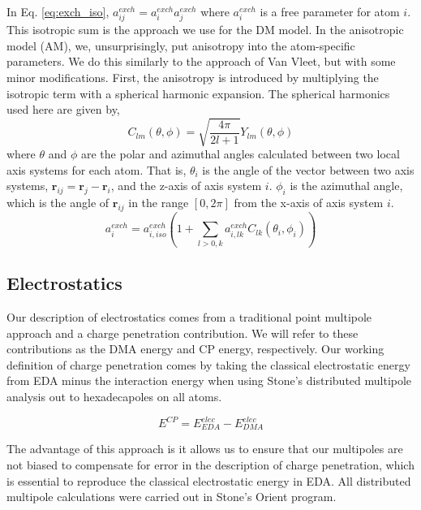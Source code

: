 \documentclass[journal=jacsat,manuscript=article]{achemso}
\begin{document}
In Eq. \ref{eq:exch_iso}, $a_{ij}^{exch}=a_{i}^{exch}a_{j}^{exch}$ where
$a_{i}^{exch}$ is a free parameter for atom $i$. This isotropic sum is the
approach we use for the DM model. In the anisotropic model (AM), we,
unsurprisingly, put anisotropy into the atom-specific parameters.
We do this similarly to the approach of Van Vleet, but with some minor
modifications\cite{van2018new}. First, the anisotropy is introduced by multiplying
the isotropic term with a spherical harmonic expansion. The spherical harmonics
used here are given by,
\begin{equation}
  C_{lm}(\theta,\phi)=\sqrt{\frac{4\pi}{2l+1}}Y_{lm}(\theta,\phi)
\end{equation}
where $\theta$ and $\phi$ are the polar and azimuthal angles
calculated between two local axis systems for each atom.\cite{bernardo1994anisotropic}
That is, $\theta_i$ is the angle of the vector between two axis systems,
$\bm{r}_{ij}=\bm{r}_j-\bm{r}_i$, and the z-axis of axis system $i$.
$\phi_i$ is the azimuthal angle, which is the angle of $\bm{r}_{ij}$ in the range $[0,2\pi]$ from the
x-axis of axis system $i$.
\begin{equation}
  a_i^{exch} = a_{i,iso}^{exch}\left(1 + \sum_{l>0,k}a_{i,lk}^{exch}C_{lk}(\theta_i,\phi_i)\right)
  \label{eq:exch_params_aniso}
\end{equation}

\subsection*{Electrostatics}

Our description of electrostatics comes from a traditional
point multipole approach and a charge penetration contribution. We will refer to
these contributions as the DMA energy and CP energy, respectively.
Our working definition of charge penetration comes by taking the
classical electrostatic energy from EDA minus the interaction energy
when using Stone's distributed multipole analysis\cite{stone1981distributed,stone1985distributeda}
out to hexadecapoles on all atoms.

\begin{equation}
  E^{CP}=E^{elec}_{EDA}-E^{elec}_{DMA}
\end{equation}

The advantage of this approach is it allows us to ensure that
our multipoles are not biased to compensate for error in the
description of charge penetration, which is essential to reproduce
the classical electrostatic energy in EDA.
All distributed multipole calculations were carried out
in Stone's Orient program.\cite{stone2002orient}
\end{document}
